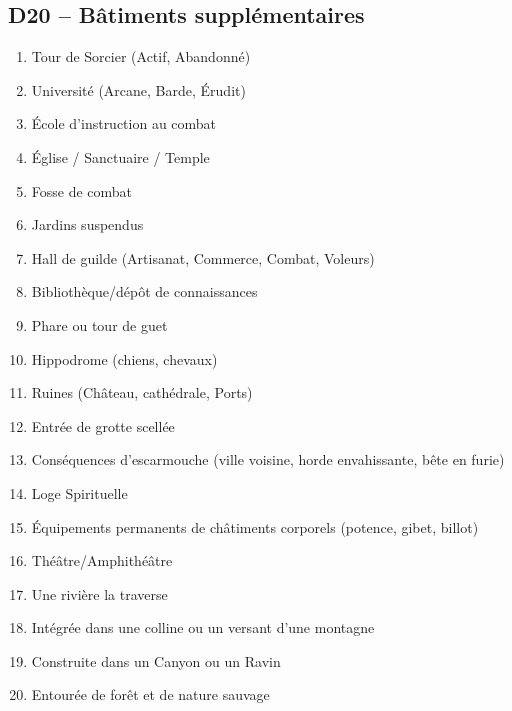 \documentclass{article}
\begin{document}
\begin{multicols}{2}
	\section*{D20 -- Bâtiments supplémentaires}
	\begin{enumerate}
		\item Tour de Sorcier (Actif, Abandonné)
		\item Université (Arcane, Barde, Érudit)
		\item École d'instruction au combat
		\item Église / Sanctuaire / Temple
		\item Fosse de combat
		\item Jardins suspendus
		\item Hall de guilde (Artisanat, Commerce, Combat, Voleurs)
		\item Bibliothèque/dépôt de connaissances
		\item Phare ou tour de guet
		\item Hippodrome (chiens, chevaux)
		\item Ruines (Château, cathédrale, Ports)
		\item Entrée de grotte scellée
		\item Conséquences d’escarmouche (ville voisine, horde envahissante, bête en furie)
		\item Loge Spirituelle
		\item Équipements permanents de châtiments corporels (potence, gibet, billot)
		\item Théâtre/Amphithéâtre
		\item Une rivière la traverse
		\item Intégrée dans une colline ou un versant d'une montagne
		\item Construite dans un Canyon ou un Ravin
		\item Entourée de forêt et de nature sauvage
	\end{enumerate}
\end{multicols}
\end{document}
